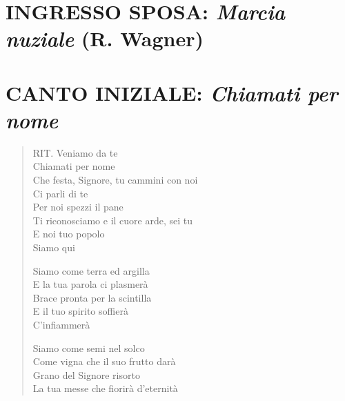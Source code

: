 \section*{INGRESSO SPOSA: \textit{Marcia nuziale} (R. Wagner)}

\section*{CANTO INIZIALE: \textit{Chiamati per nome}}

\begin{verse}
	\begin{mystrofe}
	RIT. Veniamo da te \\
	Chiamati per nome \\
	Che festa, Signore, tu cammini con noi \\
	Ci parli di te \\
	Per noi spezzi il pane \\
	Ti riconosciamo e il cuore arde, sei tu \\
	E noi tuo popolo \\
	Siamo qui
	\end{mystrofe}

	\begin{mystrofe}
	Siamo come terra ed argilla \\
	E la tua parola ci plasmerà \\
	Brace pronta per la scintilla \\
	E il tuo spirito soffierà \\
	C'infiammerà
	\end{mystrofe}


	\begin{mystrofe}
	Siamo come semi nel solco \\
	Come vigna che il suo frutto darà \\
	Grano del Signore risorto \\
	La tua messe che fiorirà d'eternità
	\end{mystrofe}

\end{verse}
